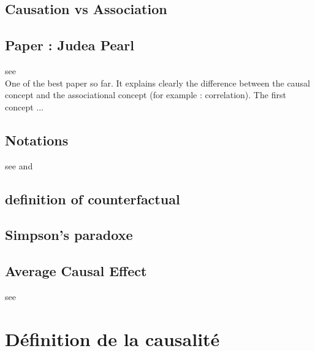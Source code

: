 \documentclass{article}
\begin{document}
\subsection{Causation vs Association}

\subsection{Paper : Judea Pearl}

see \cite{pearl2010mathematics} \\
One of the best paper so far. It explains clearly the difference between the causal concept and the associational concept (for example : correlation). The first concept ...

\subsection{Notations}
see \cite{yao2020survey} and \cite{hernan2020causal}

\subsection{definition of counterfactual}

\subsection{Simpson's paradoxe}

\subsection{Average Causal Effect}

see \cite{hernan2020causal}



\newpage
\section{Définition de la causalité}
\cite{rubin2005causal}

\newpage
\nocite{*}    %

\end{document}
